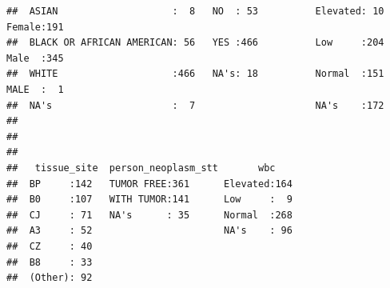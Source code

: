 \documentclass[]{article}
\begin{document}
\begin{verbatim}
##  ASIAN                    :  8   NO  : 53          Elevated: 10   Female:191  
##  BLACK OR AFRICAN AMERICAN: 56   YES :466          Low     :204   Male  :345  
##  WHITE                    :466   NA's: 18          Normal  :151   MALE  :  1  
##  NA's                     :  7                     NA's    :172               
##                                                                               
##                                                                               
##                                                                               
##   tissue_site  person_neoplasm_stt       wbc     
##  BP     :142   TUMOR FREE:361      Elevated:164  
##  B0     :107   WITH TUMOR:141      Low     :  9  
##  CJ     : 71   NA's      : 35      Normal  :268  
##  A3     : 52                       NA's    : 96  
##  CZ     : 40                                     
##  B8     : 33                                     
##  (Other): 92
\end{verbatim}
\end{document}
